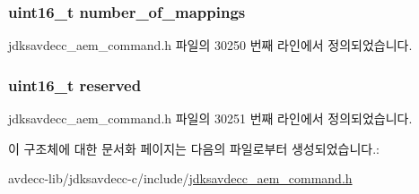 \subsubsection[{\texorpdfstring{number\+\_\+of\+\_\+mappings}{number_of_mappings}}]{\setlength{\rightskip}{0pt plus 5cm}uint16\+\_\+t number\+\_\+of\+\_\+mappings}\hypertarget{structjdksavdecc__aem__command__add__video__mappings_ac7db472c5622ef473d5d0a5c416d5531}{}\label{structjdksavdecc__aem__command__add__video__mappings_ac7db472c5622ef473d5d0a5c416d5531}


jdksavdecc\+\_\+aem\+\_\+command.\+h 파일의 30250 번째 라인에서 정의되었습니다.

\subsubsection[{\texorpdfstring{reserved}{reserved}}]{\setlength{\rightskip}{0pt plus 5cm}uint16\+\_\+t reserved}\hypertarget{structjdksavdecc__aem__command__add__video__mappings_a5a6ed8c04a3db86066924b1a1bf4dad3}{}\label{structjdksavdecc__aem__command__add__video__mappings_a5a6ed8c04a3db86066924b1a1bf4dad3}


jdksavdecc\+\_\+aem\+\_\+command.\+h 파일의 30251 번째 라인에서 정의되었습니다.



이 구조체에 대한 문서화 페이지는 다음의 파일로부터 생성되었습니다.\+:\begin{DoxyCompactItemize}
\item 
avdecc-\/lib/jdksavdecc-\/c/include/\hyperlink{jdksavdecc__aem__command_8h}{jdksavdecc\+\_\+aem\+\_\+command.\+h}\end{DoxyCompactItemize}
